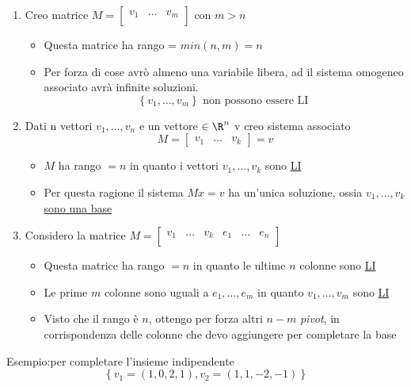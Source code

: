 \documentclass[12pt,a4paper,oneside]{article}
\begin{document}
\begin{enumerate}
	\item Creo matrice $M = \begin{bmatrix}
			      v_1 & \ldots & v_m \\
		      \end{bmatrix}
	      $
	      con  $m > n$
	      \begin{itemize}
		      \item Questa matrice ha rango = $min\left( n,m \right) =n$
		      \item Per forza di cose avrò almeno una variabile libera, ad il sistema omogeneo associato avrà infinite soluzioni.
		            \[
			            \left\{ v_1,\ldots,v_m \right\} \text{ non possono essere LI }
		            \]
	      \end{itemize}
	\item Dati n vettori $v_1,\ldots,v_n$ e un vettore $ \in  \R^{n}$ v creo sistema associato
	      \[
		      M=\begin{bmatrix}
			      v_1 & \ldots & v_k
		      \end{bmatrix}
		      =v
	      \]
	      \begin{itemize}
		      \item $M$ ha rango $=n$ in quanto i vettori $v_1,\ldots,v_k$ sono \underline{LI}
		      \item Per questa ragione il sistema $Mx=v$ ha un'unica soluzione, ossia \underline{ $v_1,\ldots,v_k$ sono una base}
	      \end{itemize}
	\item Considero la matrice $M= \begin{bmatrix}
			      v_1 & \ldots & v_k & e_1 & \ldots & e_n \\
		      \end{bmatrix}
	      $
	      \begin{itemize}
		      \item Questa matrice ha rango $=n$ in quanto le ultime $n$ colonne sono \underline{LI}
		      \item Le prime $m$ colonne sono uguali a $e_1,\ldots,e_m$ in quanto $v_1,\ldots,v_m$ sono  \underline{LI}
		      \item  Visto che il rango è $n$, ottengo per forza altri $n-m$ \textit{pivot}, in corrispondenza delle colonne che devo aggiungere per completare la base
	      \end{itemize}
\end{enumerate}
Esempio:per completare l'insieme indipendente
$$
	\left\{v_1=(1,0,2,1), v_2=(1,1,-2,-1)\right\}
$$
\end{document}
